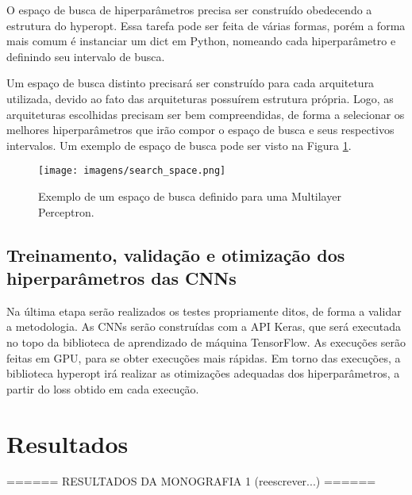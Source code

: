 \documentclass[
12pt,				%
openright,			%
oneside,			%
a4paper,			%
english,			%
french,				%
spanish,			%
brazil				%
]{abntex2}
\begin{document}
O espaço de busca de hiperparâmetros precisa ser construído obedecendo a estrutura do hyperopt. Essa tarefa pode ser feita de várias formas, porém a forma mais comum é instanciar um dict em Python, nomeando cada hiperparâmetro e definindo seu intervalo de busca. 

Um espaço de busca distinto precisará ser construído para cada arquitetura utilizada, devido ao fato das arquiteturas possuírem estrutura própria. Logo, as arquiteturas escolhidas precisam ser bem compreendidas, de forma a selecionar os melhores hiperparâmetros que irão compor o espaço de busca e seus respectivos intervalos. Um exemplo de espaço de busca pode ser visto na Figura \ref{fig:search_space}.

\begin{figure}[ht]
\centering
\caption{Exemplo de um espaço de busca definido para uma Multilayer Perceptron.}
\texttt{[image: imagens/search\_space.png]}
\label{fig:search_space}
\end{figure}

\section{Treinamento, validação e otimização dos hiperparâmetros das CNNs}

Na última etapa serão realizados os testes propriamente ditos, de forma a validar a metodologia. As CNNs serão construídas com a API Keras, que será executada no topo da biblioteca de aprendizado de máquina TensorFlow. As execuções serão feitas em GPU, para se obter execuções mais rápidas. Em torno das execuções, a biblioteca hyperopt irá realizar as otimizações adequadas dos hiperparâmetros, a partir do loss obtido em cada execução.



\chapter{Resultados}

\begin{center}
====== RESULTADOS DA MONOGRAFIA 1 (reescrever...) ======
\end{center}
\end{document}

